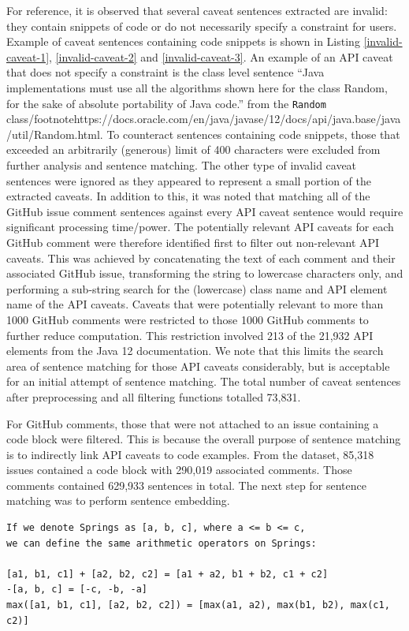 For reference, it is observed that several caveat sentences extracted are invalid: they contain snippets of code or do not necessarily specify a constraint for users. Example of caveat sentences containing code snippets is shown in Listing \ref{invalid-caveat-1}, \ref{invalid-caveat-2} and \ref{invalid-caveat-3}. An example of an API caveat that does not specify a constraint is the class level sentence ``Java implementations must use all the algorithms shown here for the class Random, for the sake of absolute portability of Java code.'' from the \lstinline{Random} class/footnote{https://docs.oracle.com/en/java/javase/12/docs/api/java.base/java/util/Random.html}. To counteract sentences containing code snippets, those that exceeded an arbitrarily (generous) limit of 400 characters were excluded from further analysis and sentence matching. The other type of invalid caveat sentences were ignored as they appeared to represent a small portion of the extracted caveats.
In addition to this, it was noted that matching all of the GitHub issue comment sentences against every API caveat sentence would require significant processing time/power. The potentially relevant API caveats for each GitHub comment were therefore identified first to filter out non-relevant API caveats. This was achieved by concatenating the text of each comment and their associated GitHub issue, transforming the string to lowercase characters only, and performing a sub-string search for the (lowercase) class name and API element name of the API caveats. Caveats that were potentially relevant to more than 1000 GitHub comments were restricted to those 1000 GitHub comments to further reduce computation. This restriction involved 213 of the 21,932 API elements from the Java 12 documentation. We note that this limits the search area of sentence matching for those API caveats considerably, but is acceptable for an initial attempt of sentence matching. The total number of caveat sentences after preprocessing and all filtering functions totalled 73,831.\bigbreak

For GitHub comments, those that were not attached to an issue containing a code block were filtered. This is because the overall purpose of sentence matching is to indirectly link API caveats to code examples. From the dataset, 85,318 issues contained a code block with  290,019 associated comments. Those comments contained 629,933 sentences in total. The next step for sentence matching was to perform sentence embedding.

\begin{lstlisting}[label=invalid-caveat-1,caption={An example of a caveat sentence extracted from the \lstinline{javax.swing.Spring} documentation containing some snippets of code or mathematical expressions},float,frame=tb,numbers=none,language=None,linebackgroundcolor={\lstcolorlines{4,5,6}}]
If we denote Springs as [a, b, c], where a <= b <= c, 
we can define the same arithmetic operators on Springs:

[a1, b1, c1] + [a2, b2, c2] = [a1 + a2, b1 + b2, c1 + c2]
-[a, b, c] = [-c, -b, -a]
max([a1, b1, c1], [a2, b2, c2]) = [max(a1, a2), max(b1, b2), max(c1, c2)]
\end{lstlisting}

